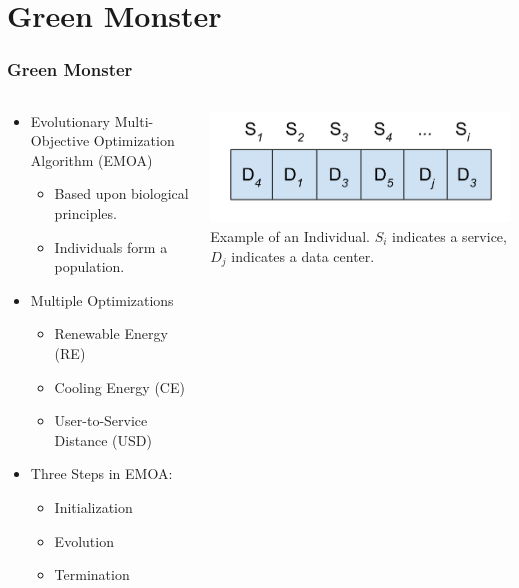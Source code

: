 \documentclass{beamer}
\begin{document}
\section[Green Monster]{Green Monster}
\begin{frame}
  \frametitle{Green Monster}
\begin{columns}
\begin{column}{0.65\textwidth}
  \begin{itemize}
 		\item Evolutionary Multi-Objective Optimization Algorithm (EMOA)
 		\begin{itemize}
 			\item Based upon biological principles.
 			\item Individuals form a population.
 		\end{itemize}
	\item Multiple Optimizations
 		\begin{itemize}
			\item Renewable Energy (RE)
			\item Cooling Energy (CE)
			\item User-to-Service Distance (USD)
		\end{itemize}
	\item Three Steps in EMOA: 
		\begin{itemize}
			\item Initialization
			\item Evolution
			\item Termination
		\end{itemize}
  \end{itemize}
\end{column}
\begin{column}{0.35\textwidth}
\includegraphics[width=.95\textwidth]{Individual.png} \\
\tiny{Example of an Individual. $S_i$ indicates a service, $D_j$ indicates a data center.}
\end{column}
\end{columns}


\end{frame}
 	
\end{document}
